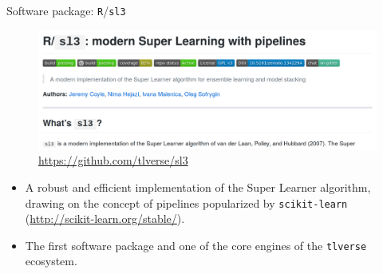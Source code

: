 \documentclass{beamer}
\begin{document}
\begin{frame}[c]{Software package: \texttt{R}/\texttt{sl3}}

\begin{figure}[H]
  \centering
  \includegraphics[width=\textwidth]{sl3}
  \caption{
    \url{https://github.com/tlverse/sl3}
  }
\end{figure}

\vspace{-2em}

\begin{center}
\begin{itemize}
  \itemsep4pt
  \item A robust and efficient implementation of the Super Learner algorithm,
    drawing on the concept of pipelines popularized by \texttt{scikit-learn}
    (\url{http://scikit-learn.org/stable/}).
  \item The first software package and one of the core engines of the
    \texttt{tlverse} ecosystem.
\end{itemize}
\end{center}


\end{frame}

\end{document}
